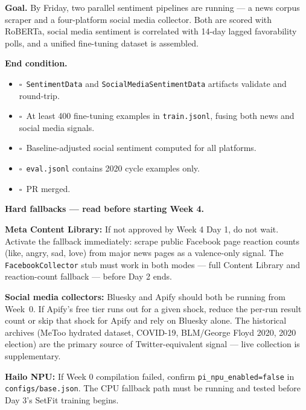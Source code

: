 \documentclass[11pt]{article}
\newcommand{\done}{\textcolor{sectionblue}{$\square$}\ }
\begin{document}
\textbf{Goal.} By Friday, two parallel sentiment pipelines are running --- a news
corpus scraper and a four-platform social media collector. Both are scored with
RoBERTa, social media sentiment is correlated with 14-day lagged favorability
polls, and a unified fine-tuning dataset is assembled.

\textbf{End condition.}
\begin{itemize}[leftmargin=1.6em, itemsep=1pt]
  \item \done \texttt{SentimentData} and \texttt{SocialMediaSentimentData} artifacts
        validate and round-trip.
  \item \done At least 400 fine-tuning examples in \texttt{train.jsonl}, fusing
        both news and social media signals.
  \item \done Baseline-adjusted social sentiment computed for all platforms.
  \item \done \texttt{eval.jsonl} contains 2020 cycle examples only.
  \item \done PR merged.
\end{itemize}

\begin{mdframed}[backgroundcolor=warn, linecolor=darkblue, linewidth=0.8pt,
  innerleftmargin=10pt, innerrightmargin=10pt, innertopmargin=6pt, innerbottommargin=6pt]
\textbf{Hard fallbacks --- read before starting Week 4.}

\textbf{Meta Content Library:} If not approved by Week 4 Day 1, do not wait.
Activate the fallback immediately: scrape public Facebook page reaction counts
(like, angry, sad, love) from major news pages as a valence-only signal. The
\texttt{FacebookCollector} stub must work in both modes --- full Content Library
and reaction-count fallback --- before Day 2 ends.

\textbf{Social media collectors:} Bluesky and Apify should both be running from
Week~0. If Apify's free tier runs out for a given shock, reduce the per-run result
count or skip that shock for Apify and rely on Bluesky alone. The historical archives
(MeToo hydrated dataset, COVID-19, BLM/George Floyd 2020, 2020 election) are the primary source of Twitter-equivalent
signal --- live collection is supplementary.

\textbf{Hailo NPU:} If Week 0 compilation failed, confirm \texttt{pi\_npu\_enabled=false}
in \texttt{configs/base.json}. The CPU fallback path must be running and tested
before Day 3's SetFit training begins.
\end{mdframed}
\end{document}
